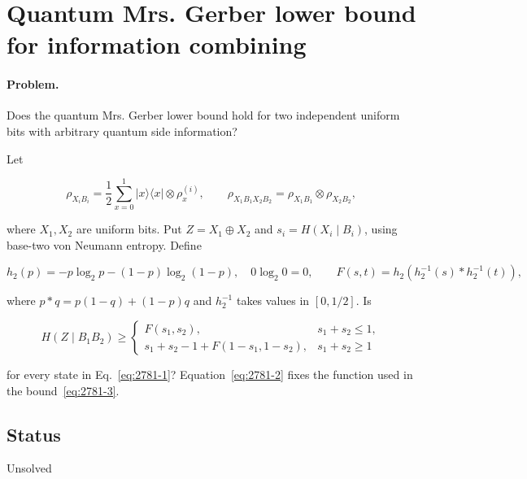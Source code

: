 \section{Quantum Mrs. Gerber lower bound for information combining}
\label{sec:op_278166a49baedfdd}

\paragraph{Problem.}
Does the quantum Mrs. Gerber lower bound hold for two independent uniform bits with arbitrary quantum side information?

Let

\begin{equation}
\rho_{X_iB_i}=\frac12\sum_{x=0}^1|x\rangle\langle x|\otimes\rho_x^{(i)},
\qquad
\rho_{X_1B_1X_2B_2}=\rho_{X_1B_1}\otimes\rho_{X_2B_2},
\label{eq:2781-1}
\end{equation}

where $X_1,X_2$ are uniform bits. Put $Z=X_1\oplus X_2$ and $s_i=H(X_i\mid B_i)$, using base-two von Neumann entropy. Define

\begin{equation}
h_2(p)=-p\log_2p-(1-p)\log_2(1-p),\quad 0\log_2 0=0,
\qquad
F(s,t)=h_2\!\left(h_2^{-1}(s)*h_2^{-1}(t)\right),
\label{eq:2781-2}
\end{equation}

where $p*q=p(1-q)+(1-p)q$ and $h_2^{-1}$ takes values in $[0,1/2]$. Is

\begin{equation}
H(Z\mid B_1B_2)\ge
\begin{cases}
F(s_1,s_2), & s_1+s_2\leq1,\\
s_1+s_2-1+F(1-s_1,1-s_2), & s_1+s_2\geq1
\end{cases}
\label{eq:2781-3}
\end{equation}

for every state in Eq.~\eqref{eq:2781-1}? Equation~\eqref{eq:2781-2} fixes the function used in the bound~\eqref{eq:2781-3}.

\subsection*{Status}

Unsolved

